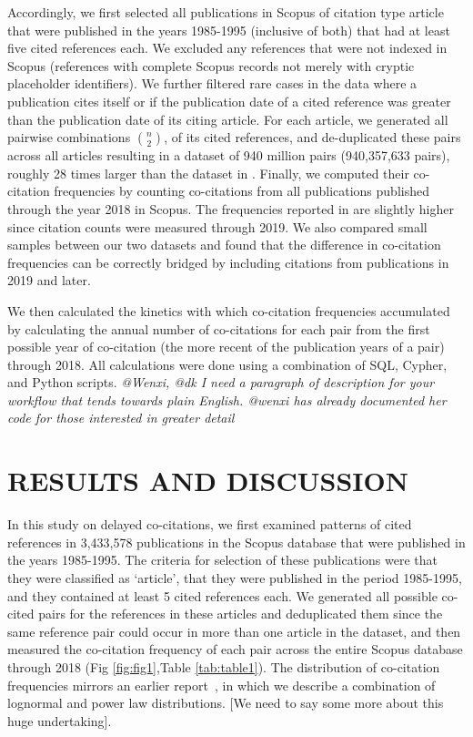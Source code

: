 \documentclass[utf8]{frontiersSCNS}
\begin{document}
Accordingly, we first selected all publications in Scopus of citation type article that were published in the years 1985-1995 (inclusive of both) that had at least five cited references each. We excluded any references that were not indexed in Scopus (references with complete Scopus records not merely with cryptic placeholder identifiers). We further filtered rare cases in the data where a publication cites itself or if the publication date of a cited reference was greater than the publication date of its citing article. For each article, we generated all pairwise combinations $n\choose 2$, of its cited references, and de-duplicated these pairs across all articles resulting in a dataset of 940 million pairs (940,357,633 pairs), roughly 28 times larger than the dataset in \cite{devarakonda_2020}. Finally, we computed their co-citation frequencies by counting co-citations from all publications published through the year 2018 in Scopus.  The frequencies reported in  \cite{devarakonda_2020} are slightly higher since citation counts were measured through 2019. We also compared small samples between our two datasets and found that the difference in co-citation frequencies can be correctly bridged by including citations from publications in 2019 and later. 

We then calculated the kinetics with which co-citation frequencies accumulated by calculating the annual number of co-citations for each pair from the first possible year of co-citation (the more recent of the publication years of a pair) through 2018. All calculations were done using a combination of SQL, Cypher, and Python scripts. \emph{@Wenxi, @dk I need a paragraph of description for your workflow that tends towards plain English. @wenxi has already documented her code for those interested in greater detail}

\section{RESULTS AND DISCUSSION}

In this study on delayed co-citations, we first examined patterns of cited references in 3,433,578 publications in the Scopus database that were published in the years 1985-1995. The criteria for selection of these publications were that they were classified as `article', that they were published in the period 1985-1995, and they contained at least 5 cited references each. We generated all possible co-cited pairs for the references in these articles and deduplicated them since the same reference pair could occur in more than one article in the dataset, and then measured the co-citation frequency of each pair across the entire Scopus database through 2018 (Fig \ref{fig:fig1},Table \ref{tab:table1}). The distribution of co-citation frequencies mirrors an earlier report~\citep{devarakonda_2020}, in which we describe a combination of lognormal and power law distributions. [We need to say some more about this huge undertaking].
\end{document}
